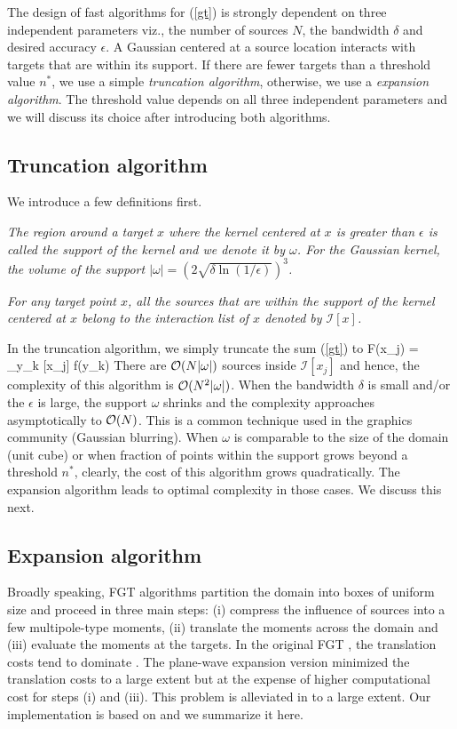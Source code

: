
The design of fast algorithms for (\ref{gt}) is strongly dependent on three independent parameters viz., the number of sources $N$, the bandwidth $\delta$ and desired accuracy $\epsilon$. A Gaussian centered at a source location interacts with targets that are within its support. If there are fewer targets than a threshold value $n^*$, we use a simple {\em truncation algorithm}, otherwise, we use a {\em expansion algorithm}. The threshold  value depends on all three independent parameters and we will discuss its choice after introducing both algorithms. 

\subsection{Truncation algorithm} 
We introduce a few definitions first.
\begin{mydef} {\em The region around a target $x$ where the kernel centered at $x$ is greater than $\epsilon$ is called the support of the kernel and we denote it by $\omega$. For the Gaussian kernel, the volume of the support  $\displaystyle |\omega| = \left(2 \sqrt{\delta \ln (1/\epsilon)} \right)^3$.  }
\end{mydef}

\begin{mydef} {\em For any target point $x$, all the sources that are within the support of the kernel centered at $x$ belong to the interaction list of $x$ denoted by $\mathcal{I}[x]$.}
\end{mydef}
In the truncation algorithm, we simply truncate the sum (\ref{gt}) to
%
\beq F(x_j) = \sum_{y_k \in {}[x_j]}  f(y_k) \label{eqn:truncation} \eeq
%
There are $\mathcal{O}(N |\omega|)$ sources inside $\mathcal{I}[x_j]$ and hence, the complexity of this algorithm is $\mathcal{O}(N^2 |\omega|)$. When the bandwidth $\delta$ is small and/or the $\epsilon$ is large, the support $\omega$ shrinks and the complexity approaches asymptotically to $\mathcal{O}(N)$. This is a common technique used in the graphics community (Gaussian blurring). When $\omega$ is comparable to the size of the domain (unit cube) or when fraction of points within the support grows beyond a threshold $n^*$, clearly, the cost of this algorithm grows quadratically. The expansion algorithm leads to optimal complexity in those cases. We discuss this next.

\subsection{Expansion algorithm}
Broadly speaking, FGT algorithms \cite{fgt, greengard98} partition the domain into boxes of uniform size and proceed in three main steps: (i) compress the influence of sources into a few multipole-type moments, (ii) translate the moments across the domain and (iii) evaluate the moments at the targets. In the original FGT \cite{fgt}, the translation costs tend to dominate \cite{fggt}. The plane-wave expansion version \cite{greengard98} minimized the translation costs to a large extent but at the expense of higher computational cost for steps (i) and (iii). This problem is alleviated in \cite{fggt} to a large extent. Our implementation is based on \cite{fggt} and we summarize it here. 

